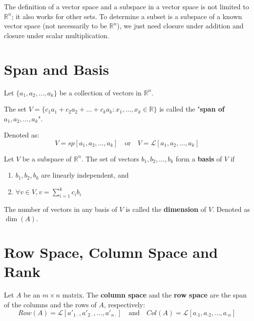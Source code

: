 \begin{remark*}
    The definition of a vector space and a subspace in a vector space is not limited to $\mathbb{R}^{n}$; it also works for other sets. To determine a subset is a subspace of a known vector space (not necessarily to be $\mathbb{R}^{n}$), we just need closure under addition and closure under scalar multiplication.
\end{remark*}

\section{Span and Basis}

\begin{definition}
    Let $\{a_{1}, a_{2}, \dots, a_{k}\}$ be a collection of vectors in $\mathbb{R}^{n}$.

    The set $V = \{c_{1}a_{1}+c_{2}a_{2}+\dots+c_{k}a_{k}: x_{1}, \dots,x_{k} \in \mathbb{R}\}$ is called the "\textbf{span of $a_{1}, a_{2}, \dots, a_{k}$}".

    Denoted as: \begin{equation*}
        V=sp[a_{1}, a_{2}, \dots, a_{k}] \quad \text{or} \quad V = \mathcal{L}[a_{1}, a_{2}, \dots, a_{k}]
    \end{equation*}
\end{definition}

\begin{definition}
    Let $V$ be a subspace of $\mathbb{R}^{n}$. The set of vectors ${b_{1}, b_{2}, \dots, b_{k}}$ form a \textbf{basis} of $V$ if
    \begin{enumerate}
        \item $b_{1}, b_{2}, b_{k}$ are linearly independent, and
        \item $\forall v \in V, v = \sum_{i=1}^{k}c_{i}b_{i}$
    \end{enumerate}
\end{definition}

\begin{definition}
    The number of vectors in any basis of $V$ is called the \textbf{dimension} of $V$. Denoted as $\dim(A)$.
\end{definition}

\section{Row Space, Column Space and Rank} %

\begin{definition}
    Let $A$ be an $m \times n$ matrix. The \textbf{column space} and the \textbf{row space} are the span of the columns and the rows of $A$, respectively:
    \begin{equation*}
        Row(A)=\mathcal{L}[a'_{1\cdot},a'_{2\cdot},\dots,a'_{n\cdot}] \quad \text{and} \quad Col(A) = \mathcal{L}[a_{\cdot 1},a_{\cdot 2},\dots,a_{\cdot n}]
    \end{equation*}
\end{definition}

